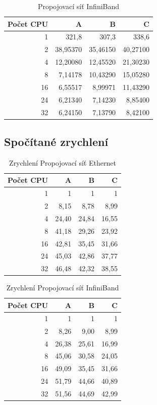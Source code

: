 \documentclass[12pt]{article}
\begin{document}
\begin{table}[H]
\begin{center}
\begin{tabular}{|r|r|r|r|}
\hline
Počet CPU & A & B & C\\
\hline
1 & 321,8 & 307,3 & 338,6\\
\hline
2 & 38,95370 & 35,46150 & 40,27100\\
\hline
4 & 12,20080 & 12,45520 & 21,30230\\
\hline
8 & 7,14178 & 10,43290 & 15,05280\\
\hline
16 & 6,55517 & 8,99971 & 11,43290\\
\hline
24 & 6,21340 & 7,14230 & 8,85400\\
\hline
32 & 6,24150 & 7,13790 & 8,42100\\
\hline
\end{tabular} 
\end{center}
\caption{Propojovací síť InfiniBand}
\end{table}

\subsection{Spočítané zrychlení}
\begin{table}[H]
\begin{center}
\begin{tabular}{|r|r|r|r|}
\hline
Počet CPU & A & B & C\\
\hline
1 & 1 & 1 & 1\\
\hline
2 & 8,15 & 8,78 & 8,99\\
\hline
4 & 24,40 & 24,84 & 16,55\\
\hline
8 & 41,18 & 29,26 & 23,92\\
\hline
16 & 42,81 & 35,45 & 31,66\\
\hline
24 & 45,03 & 42,86 & 37,77\\
\hline
32 & 46,48 & 42,32 & 38,55\\
\hline
\end{tabular}
\end{center}
\caption{Zrychlení Propojovací síť Ethernet}
\end{table}

\begin{table}[H]
\begin{center}
\begin{tabular}{|r|r|r|r|}
\hline
Počet CPU & A & B & C\\
\hline
1 & 1 & 1 & 1\\
\hline
2 & 8,26 & 9,00 & 8,99\\
\hline
4 & 26,38 & 25,61 & 16,99\\
\hline
8 & 45,06 & 30,58 & 24,05\\
\hline
16 & 49,09 & 35,45 & 31,66\\
\hline
24 & 51,79 & 44,66 & 40,89\\
\hline
32 & 51,56 & 44,69 & 42,99\\
\hline
\end{tabular} 
\end{center}
\caption{Zrychlení Propojovací síť InfiniBand}
\end{table}
\end{document}
